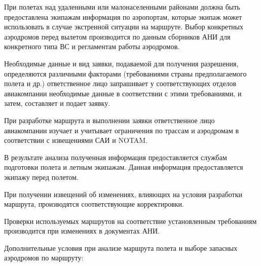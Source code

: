  При полетах над удаленными или малонаселенными районами должна быть предоставлена экипажам информация по аэропортам, которые экипаж может использовать в случае экстренной ситуации на маршруте. Выбор конкретных аэродромов перед вылетом производится по данным сборников АНИ для конкретного типа ВС и регламентам работы аэродромов. 

 Необходимые данные и вид заявки, подаваемой для получения разрешения, определяются различными факторами (требованиями страны предполагаемого полета и др.) ответственное лицо запрашивает у соответствующих отделов авиакомпании необходимые данные в соответствии с этими требованиями, и затем, составляет и подает заявку.

При разработке маршрута и выполнении заявки ответственное лицо авиакомпании изучает и учитывает ограничения по трассам и аэродромам в соответствии с извещениями САИ и NOTAM.

 В результате анализа полученная информация предоставляется службам подготовки полета и летным экипажам. Данная информация предоставляется экипажу перед полетом.

При получении извещений об изменениях, влияющих на условия разработки маршрута, производятся соответствующие корректировки.

Проверки используемых маршрутов на соответствие установленным требованиям производится при изменениях в документах АНИ.

Дополнительные условия при анализе маршрута полета и выборе запасных аэродромов по маршруту: 

